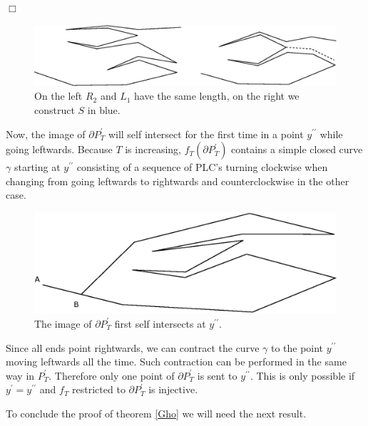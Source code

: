 \documentclass[openright, 12pt]{article}
\begin{document}
\hfill $\Box$



\begin{figure}[h]
\centering
\includegraphics[scale=0.7]{S.eps}
\caption{On the left $R_2$ and $L_1$ have the same length, on the right we construct $S$ in blue.} \label{S}
\end{figure}




Now, the image of $\partial  P^{\prime}_T$ will self intersect for the first time in a point $y^{\prime\prime}$ while going leftwards. Because $T$ is increasing, $f_T(\partial P_T^{\prime})$ contains a simple closed curve $\gamma$ starting at $y^{\prime \prime}$ consisting of a sequence of PLC's turning clockwise when changing from going leftwards to rightwards and counterclockwise in the other case.




\begin{figure}[h]
\centering
{}
\includegraphics[scale=0.7]{Prime.eps}
\caption{The image of $\partial P^{\prime}_T$ first self intersects at $y^{\prime \prime}$.}
\end{figure}


Since all ends point rightwards, we can contract the curve $\gamma$ to the point  $y^{\prime \prime}$ moving leftwards all the time. Such contraction can be performed in the same way in $P^{\prime}_T$. Therefore only one point of $\partial P^{\prime } _T$ is sent to $y^{\prime \prime}$. This is only possible if $y^{\prime} = y^{\prime \prime}$ and $f_T$ restricted to $\partial P^{\prime}_T$ is injective.


To conclude the proof of theorem \ref{Gho} we will need the next result.
\end{document}
